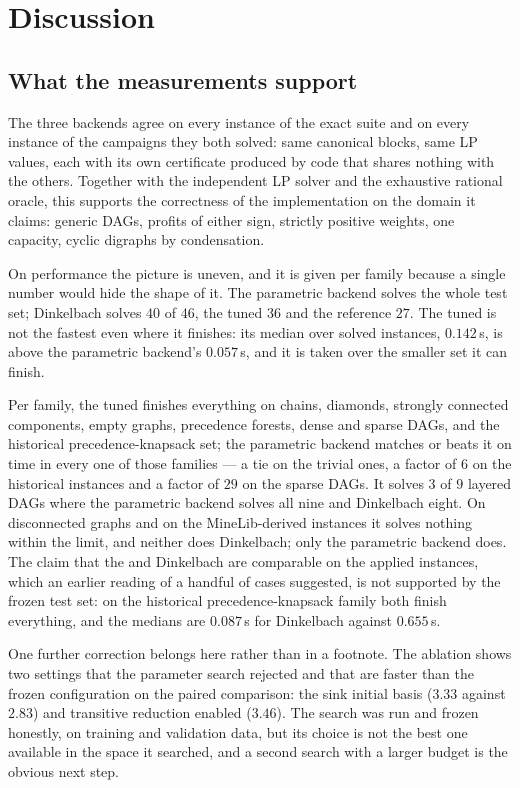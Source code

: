 \section{Discussion}
\label{sec:discussion}

\subsection{What the measurements support}

The three backends agree on every instance of the exact suite and on every
instance of the campaigns they both solved: same canonical blocks, same LP
values, each with its own certificate produced by code that shares nothing with
the others. Together with the independent LP solver and the exhaustive rational
oracle, this supports the correctness of the implementation on the domain it
claims: generic DAGs, profits of either sign, strictly positive weights, one
capacity, cyclic digraphs by condensation.

On performance the picture is uneven, and it is given per family because a
single number would hide the shape of it. The parametric backend solves the whole
test set; Dinkelbach solves $40$ of $46$, the tuned \FS{} $36$ and the reference
\FSC{} $27$. The tuned \FS{} is not the fastest even where it finishes: its
median over solved instances, $0.142$\,s, is above the parametric backend's
$0.057$\,s, and it is taken over the smaller set it can finish.

Per family, the tuned \FS{} finishes everything on chains, diamonds, strongly
connected components, empty graphs, precedence forests, dense and sparse DAGs,
and the historical precedence-knapsack set; the parametric backend matches or
beats it on time in every one of those families --- a tie on the trivial ones,
a factor of $6$ on the historical instances and a factor of $29$ on the sparse
DAGs. It solves $3$ of $9$ layered
DAGs where the parametric backend solves all nine and Dinkelbach eight. On
disconnected graphs and on the MineLib-derived instances it solves nothing
within the limit, and neither does Dinkelbach; only the parametric backend does.
The claim that the \FS{} and Dinkelbach are comparable on the applied instances,
which an earlier reading of a handful of cases suggested, is not supported by
the frozen test set: on the historical precedence-knapsack family both finish
everything, and the medians are $0.087$\,s for Dinkelbach against $0.655$\,s.

One further correction belongs here rather than in a footnote. The ablation
shows two settings that the parameter search rejected and that are faster than
the frozen configuration on the paired comparison: the sink initial basis
($3.33$ against $2.83$) and transitive reduction enabled ($3.46$). The search
was run and frozen honestly, on training and validation data, but its choice is
not the best one available in the space it searched, and a second search with a
larger budget is the obvious next step.

